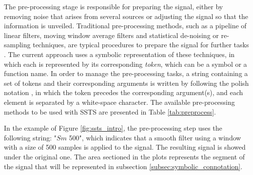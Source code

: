 The pre-processing stage is responsible for preparing the signal, either by removing noise that arises from several sources or adjusting the signal so that the information is unveiled. Traditional pre-processing methods, such as a pipeline of linear filters, moving window average filters and statistical de-noising or re-sampling techniques, are typical procedures to prepare the signal for further tasks \cite{preProcessing}. The current approach uses a symbolic representation of these techniques, in which each is represented by its corresponding \textit{token}, which can be a symbol or a function name. In order to manage the pre-processing tasks, a string containing a set of tokens and their corresponding arguments is written by following the polish notation \cite{polishNotation}, in which the token precedes the corresponding argument(s), and each element is separated by a white-space character. The available pre-processing methods to be used with \gls{SSTS} are presented in Table \ref{tab:preprocess}.
\par
In the example of Figure \ref{fig:ssts_intro}, the pre-processing step uses the following string: "$Sm$ 500", which indicates that a smooth filter using a window with a size of 500 samples is applied to the signal. The resulting signal is showed under the original one. The area sectioned in the plots represents the segment of the signal that will be represented in subsection \ref{subsec:symbolic_connotation}.

